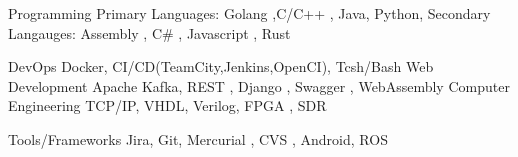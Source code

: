 

\begin{cvskills}

  \cvskill
    {Programming} %
    {Primary Languages: Golang ,C/C++ , Java, Python, Secondary Langauges: Assembly , C\# , Javascript , Rust  } %

  \cvskill
    {DevOps} %
    {Docker, CI/CD(TeamCity,Jenkins,OpenCI), Tcsh/Bash} %
  \cvskill
    {Web Development } %
    {Apache Kafka, REST , Django , Swagger , WebAssembly } %
 \cvskill
    {Computer Engineering } %
    { TCP/IP, VHDL, Verilog, FPGA , SDR } %



  \cvskill
    {Tools/Frameworks} %
    {Jira, Git, Mercurial , CVS , Android, ROS } %

\end{cvskills}